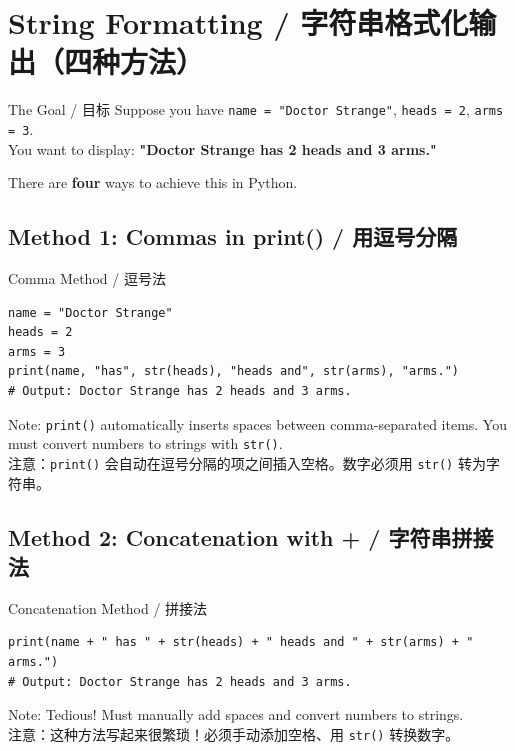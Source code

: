 \documentclass[11pt,a4paper]{report}
\let\oldtexttt\texttt
\renewcommand{\texttt}[1]{\textcolor{mainblue}{\oldtexttt{#1}}}
\begin{document}
\section{String Formatting / 字符串格式化输出（四种方法）}

\begin{concept}{The Goal / 目标}
    Suppose you have \texttt{name = "Doctor Strange"}, \texttt{heads = 2}, \texttt{arms = 3}. \\
    You want to display: \textbf{"Doctor Strange has 2 heads and 3 arms."}

    There are \textbf{four} ways to achieve this in Python.
\end{concept}

\subsection{Method 1: Commas in print() / 用逗号分隔}

\begin{examplebox}{Comma Method / 逗号法}
\begin{lstlisting}
name = "Doctor Strange"
heads = 2
arms = 3
print(name, "has", str(heads), "heads and", str(arms), "arms.")
# Output: Doctor Strange has 2 heads and 3 arms.
\end{lstlisting}
    Note: \texttt{print()} automatically inserts spaces between comma-separated items. You must convert numbers to strings with \texttt{str()}. \\
    注意：\texttt{print()} 会自动在逗号分隔的项之间插入空格。数字必须用 \texttt{str()} 转为字符串。
\end{examplebox}

\subsection{Method 2: Concatenation with + / 字符串拼接法}

\begin{examplebox}{Concatenation Method / 拼接法}
\begin{lstlisting}
print(name + " has " + str(heads) + " heads and " + str(arms) + " arms.")
# Output: Doctor Strange has 2 heads and 3 arms.
\end{lstlisting}
    Note: Tedious! Must manually add spaces and convert numbers to strings. \\
    注意：这种方法写起来很繁琐！必须手动添加空格、用 \texttt{str()} 转换数字。
\end{examplebox}
\end{document}
